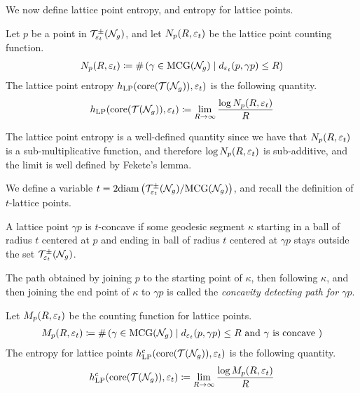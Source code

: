 We now define lattice point entropy, and entropy for \concave lattice points.
\begin{definition}
  Let $p$ be a point in $\mathcal{T}_{\varepsilon_t}^{\pm}(\mathcal{N}_g)$, and let $N_p(R, \varepsilon_t)$ be the lattice point counting function.
  \begin{align*}
    N_p(R, \varepsilon_t) \coloneqq \#\left( \gamma \in \mathrm{MCG}(\mathcal{N}_g) \mid d_{\varepsilon_t}(p, \gamma p) \leq R \right)
  \end{align*}
  The lattice point entropy $h_{\mathrm{LP}}(\mathrm{core}(\mathcal{T}(\mathcal{N}_g)), \varepsilon_t)$ is the following quantity.
  \begin{align*}
    h_{\mathrm{LP}}(\mathrm{core}(\mathcal{T}(\mathcal{N}_g)), \varepsilon_t) \coloneqq \lim_{R \to \infty} \frac{\log N_p(R, \varepsilon_t)}{R}
  \end{align*}
\end{definition}

\begin{remark}
  The lattice point entropy is a well-defined quantity since we have that $N_p(R, \varepsilon_t)$ is a sub-multiplicative function, and therefore $\log N_p(R, \varepsilon_t)$ is sub-additive, and the limit is well defined by Fekete's lemma.
\end{remark}

 We define a variable $t = 2 \mathrm{diam} \left( \mathcal{T}_{\varepsilon_t}^{\pm}(\mathcal{N}_g)/\mathrm{MCG}(\mathcal{N}_g) \right)$, and recall the definition of $t$-\concave lattice points.
\begin{definition}
 A lattice point $\gamma p$ is $t$-concave if some geodesic segment $\kappa$ starting in a ball of radius $t$ centered at $p$ and ending in ball of radius $t$ centered at $\gamma p$ stays outside the set $\mathcal{T}_{\varepsilon_t}^{\pm}(\mathcal{N}_g)$.

  The path obtained by joining $p$ to the starting point of $\kappa$, then following $\kappa$, and then joining the end point of $\kappa$ to $\gamma p$ is called the \emph{concavity detecting path for $\gamma p$}.
\end{definition}

\begin{definition}
  Let $M_p(R, \varepsilon_t)$ be the counting function for \concave lattice points.
  \begin{align*}
    M_p(R, \varepsilon_t) \coloneqq \#\left( \gamma \in \mathrm{MCG}(\mathcal{N}_g) \mid \text{$d_{\varepsilon_t}(p, \gamma p) \leq R$ and $\gamma$ is concave }  \right)
  \end{align*}
  The entropy for \concave lattice points $h_{\mathrm{LP}}^c(\mathrm{core}(\mathcal{T}(\mathcal{N}_g)), \varepsilon_t)$ is the following quantity.
  \begin{align*}
    h_{\mathrm{LP}}^c(\mathrm{core}(\mathcal{T}(\mathcal{N}_g)), \varepsilon_t) \coloneqq \lim_{R \to \infty} \frac{\log M_p(R, \varepsilon_t)}{R}
  \end{align*}
\end{definition}

